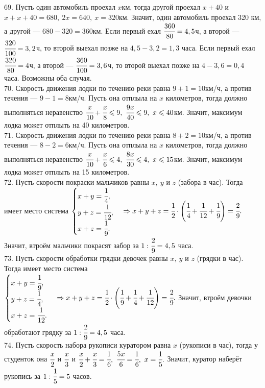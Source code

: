 69. Пусть один автомобиль проехал $x$км, тогда другой проехал $x+40$ и $x+x+40=680,\ 2x=640,\ x=320$км. Значит, один автомобиль проехал 320 км, а другой --- $680-320=360$км. Если первый ехал $\cfrac{360}{80}=4,5$ч, а второй --- $\cfrac{320}{100}=3,2$ч, то второй выехал позже на $4,5-3,2=1,3$ часа. Если первый ехал $\cfrac{320}{80}=4$ч, а второй --- $\cfrac{360}{100}=3,6$ч, то второй выехал позже на $4-3,6=0,4$ часа. Возможны оба случая.\\
70. Скорость движения лодки по течению реки равна $9+1=10$км/ч, а против течения --- $9-1=8$км/ч. Пусть она отплыла на $x$ километров, тогда должно выполняться неравенство $\cfrac{x}{10}+\cfrac{x}{8}\leqslant9,\ \cfrac{9x}{40}\leqslant9,\ x\leqslant40$км. Значит, максимум лодка может отплыть на 40 километров.\\
71. Скорость движения лодки по течению реки равна $8+2=10$км/ч, а против течения --- $8-2=6$км/ч. Пусть она отплыла на $x$ километров, тогда должно выполняться неравенство $\cfrac{x}{10}+\cfrac{x}{6}\leqslant4,\ \cfrac{8x}{30}\leqslant4,\ x\leqslant15$км. Значит, максимум лодка может отплыть на 15 километров.\\
72. Пусть скорости покраски мальчиков равны $x,\ y$ и $z$ (забора в час). Тогда имеет место система $\begin{cases} x+y=\cfrac{1}{4},\\ y+z=\cfrac{1}{12},\\ x+z=\cfrac{1}{9}.\end{cases}\Rightarrow x+y+z=\cfrac{1}{2}\cdot\left(\cfrac{1}{4}+\cfrac{1}{12}+\cfrac{1}{9}\right)=\cfrac{2}{9}.$ Значит, втроём мальчики покрасят забор за $1:\cfrac{2}{9}=4,5$ часа.\\
73. Пусть скорости обработки грядки девочек равны $x,\ y$ и $z$ (грядки в час). Тогда имеет место система $\begin{cases} x+y=\cfrac{1}{9},\\ y+z=\cfrac{1}{4},\\ x+z=\cfrac{1}{12}.\end{cases}\Rightarrow x+y+z=\cfrac{1}{2}\cdot\left(\cfrac{1}{9}+\cfrac{1}{4}+\cfrac{1}{12}\right)=\cfrac{2}{9}.$ Значит, втроём девочки обработают грядку за $1:\cfrac{2}{9}=4,5$ часа.\\
74. Пусть скорость набора рукописи куратором равна $x$ (рукописи в час), тогда у студенток она $\cfrac{x}{2}$ и $\cfrac{x}{3}$ и $\cfrac{x}{2}+\cfrac{x}{3}=\cfrac{1}{6},\ \cfrac{5x}{6}=\cfrac{1}{6},\ x=\cfrac{1}{5}.$ Значит, куратор наберёт рукопись за $1:\cfrac{1}{5}=5$ часов.\\
